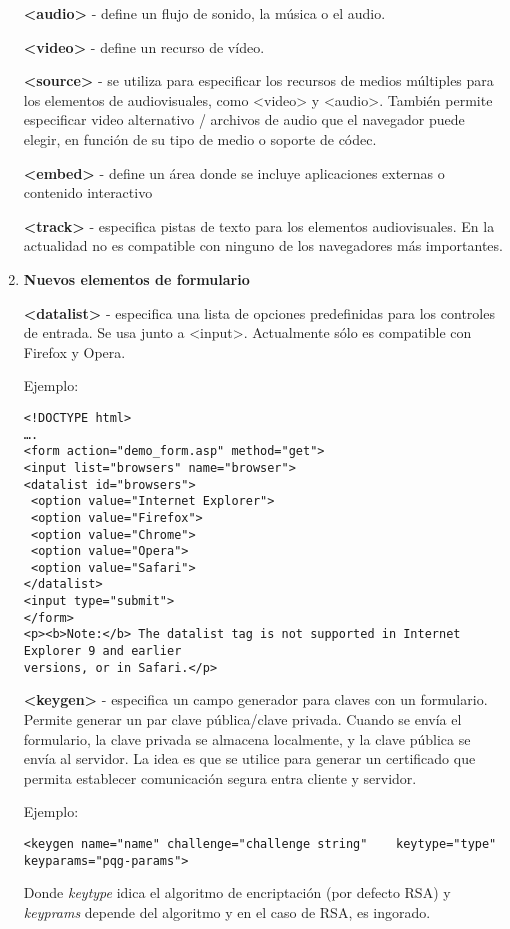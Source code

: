 \documentclass{apuntes}
\begin{document}
\begin{enumerate}
\textbf {<audio>} - define un flujo de sonido, la música o el audio.

\textbf {<video>} - define un recurso de vídeo.

\textbf {<source>} - se utiliza para especificar los recursos de medios múltiples para los elementos de audiovisuales, como <video> y <audio>. También permite especificar video alternativo / archivos de audio que el navegador puede elegir, en función de su tipo de medio o soporte de códec.

\textbf {<embed>} - define un área donde se incluye aplicaciones externas o contenido interactivo

\textbf {<track>} - especifica pistas de texto para los elementos audiovisuales. En la actualidad no es compatible con ninguno de los navegadores más importantes.

 \item \textbf{Nuevos elementos de formulario}

 \textbf{<datalist>} - especifica una lista de opciones predefinidas para los controles de entrada. Se usa junto a <input>. Actualmente sólo es compatible con Firefox y Opera.

Ejemplo:
\begin{verbatim}
<!DOCTYPE html> 
…. 
<form action="demo_form.asp" method="get"> 
<input list="browsers" name="browser"> 
<datalist id="browsers"> 
 <option value="Internet Explorer"> 
 <option value="Firefox"> 
 <option value="Chrome"> 
 <option value="Opera"> 
 <option value="Safari"> 
</datalist> 
<input type="submit"> 
</form> 
<p><b>Note:</b> The datalist tag is not supported in Internet Explorer 9 and earlier 
versions, or in Safari.</p> 

\end {verbatim}

 \textbf{<keygen>} - especifica un campo generador para claves con un formulario. Permite generar un par clave pública/clave privada. Cuando se envía el formulario, la clave privada se almacena localmente, y la clave pública se envía al servidor. La idea es que se utilice para generar un certificado que permita establecer comunicación segura  entra cliente y servidor.

Ejemplo:
\begin{verbatim}
<keygen name="name"	challenge="challenge string"	keytype="type"	keyparams="pqg-params">	
\end{verbatim}
Donde \emph{keytype} idica el algoritmo de encriptación (por defecto RSA) y \emph{keyprams} depende del algoritmo y en el caso de RSA, es ingorado.


\end{enumerate}
\end{document}
